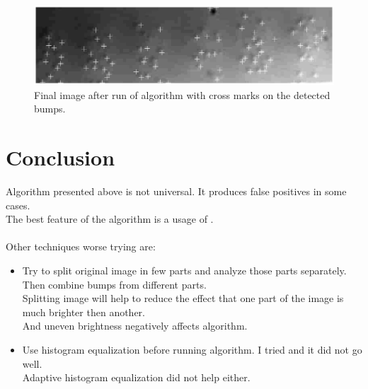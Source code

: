 \documentclass[letterpaper]{article}
\begin{document}
\begin{figure}[!htbp]
	\centering
	\includegraphics[totalheight=3cm]{./images/04_FinalBumps.jpg}
	\caption{Final image after run of algorithm with cross marks on the detected bumps.}
	\label{fig:finalImage}
\end{figure}
\newpage

\section{Conclusion}
Algorithm presented above is not universal. It produces false positives in some cases.\\
The best feature of the algorithm is a usage of .\\\\
Other techniques worse trying are:
\begin{itemize}
	\item Try to split original image in few parts and analyze those parts separately.\\
	Then combine bumps from different parts.\\
	Splitting image will help to reduce the effect that one part of the image is much brighter then another.\\
	And uneven brightness negatively affects algorithm.
	\item Use histogram equalization before running algorithm. I tried and it did not go well.\\
	Adaptive histogram equalization did not help either.
\end{itemize}
\end{document}
